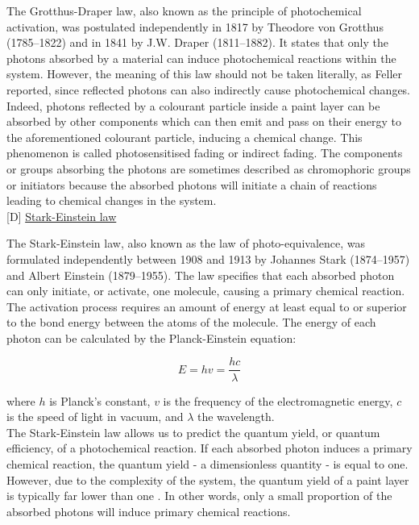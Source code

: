 The Grotthus-Draper law, also known as the principle of photochemical activation, was postulated independently in 1817 by Theodore von Grotthus (1785–1822) and in 1841 by J.W. Draper (1811–1882). It states that only the photons absorbed by a material can induce photochemical reactions within the system. However, the meaning of this law should not be taken literally, as Feller \citep[45]{feller_accelerated_1994} reported, since reflected photons can also indirectly cause photochemical changes. Indeed, photons reflected by a colourant particle inside a paint layer can be absorbed by other components which can then emit and pass on their energy to the aforementioned colourant particle, inducing a chemical change. This phenomenon is called photosensitised fading or indirect fading. The components or groups absorbing the photons are sometimes described as chromophoric groups or initiators because the absorbed photons will initiate a chain of reactions leading to chemical changes in the system.\\


[D] \underline{Stark-Einstein law}

The Stark-Einstein law, also known as the law of photo-equivalence, was formulated independently between 1908 and 1913 by Johannes Stark (1874–1957) and Albert Einstein (1879–1955). The law specifies that each absorbed photon can only initiate, or activate, one molecule, causing a primary chemical reaction. The activation process requires an amount of energy at least equal to or superior to the bond energy between the atoms of the molecule. The energy of each photon can be calculated by the Planck-Einstein equation:

\begin{equation}
  E = hv =\frac{hc}{\lambda}  
\end{equation}

where $h$ is Planck’s constant, $v$ is the frequency of the electromagnetic energy, $c$ is the speed of light in vacuum, and $\lambda$ the wavelength.\\

The Stark-Einstein law allows us to predict the quantum yield, or quantum efficiency, of a photochemical reaction. If each absorbed photon induces a primary chemical reaction, the quantum yield - a dimensionless quantity - is equal to one. However, due to the complexity of the system, the quantum yield of a paint layer is typically far lower than one \citep[50]{feller_accelerated_1994}. In other words, only a small proportion of the absorbed photons will induce primary chemical reactions.\\


